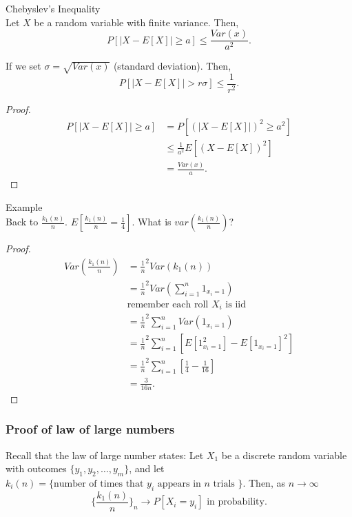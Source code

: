 \documentclass[a4paper]{article}
\begin{document}
\begin{theorem}{Chebyslev's Inequality} \\
  Let $X$ be a random variable with finite variance. Then,
   \[
     P[|X - E[X]| \geq a] \leq \frac{Var(x)}{a^{2}} 
   .\]

  If we set $\sigma = \sqrt{Var(x)} $ (standard deviation). Then,
  \[
    P[|X - E[X]| > r \sigma] \leq \frac{1}{r^{2}} 
  .\]

  \begin{proof}
    \begin{align*}
      P[|X - E[X]| \geq a] &= P[(|X- E[X]|)^{2} \geq a^{2}] \\
                           &\leq \frac{1}{a^{2}} E[(X - E[X])^{2}] \\
                           &=\frac{Var(x)}{a}
    .\end{align*}
  \end{proof}
\end{theorem}

\begin{note}{Example}\\
  Back to $\frac{k_1(n)}{n}$. $E[\frac{k_1(n)}{n} = \frac{1}{4}]$. What is $var(\frac{k_1(n)}{n})$?
  \begin{proof}
    \begin{align*}
      Var(\frac{k_1(n)}{n}) &= \frac{1}{n}^{2} Var(k_1(n)) \\
                            &= \frac{1}{n}^{2} Var(\sum_{i=1}^{n} 1_{x_i = 1}) \\
                            &\text{remember each roll $X_i$ is iid} \\
                            &= \frac{1}{n}^{2} \sum_{i=1}^{n} Var(1_{x_i=1}) \\
                            &= \frac{1}{n}^{2} \sum_{i=1}^{n} [E[1_{x_i=1}^{2}] - E[1_{x_i=1}]^{2}] \\
                            &= \frac{1}{n}^{2} \sum_{i=1}^{n} [\frac{1}{4} - \frac{1}{16}] \\
                            &= \frac{3}{16n}
    .\end{align*}
  \end{proof}
\end{note}

\subsubsection{Proof of law of large numbers}
Recall that the law of large number states:
  Let $X_1$ be a discrete random variable with outcomes  $\{y_1, y_2, \ldots, y_m\} $, and let $k_i(n) = \{\text{number of times that $y_i$ appears in $n$ trials }\} $. Then, as $n \to \infty$
  \[
    \{\frac{k_1(n)}{n}\}_{n}  \to P[X_i = y_i] \text{  in probability} 
  .\] 
\end{document}
